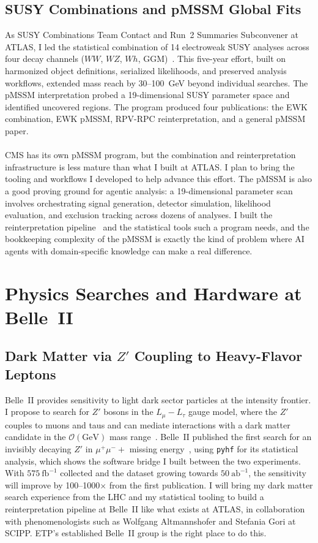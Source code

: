 \documentclass[10pt,a4paper,sans]{moderncv} %
\begin{document}
\subsection{SUSY Combinations and pMSSM Global Fits}
As SUSY Combinations Team Contact and Run~2 Summaries Subconvener at ATLAS, I led the statistical combination of 14 electroweak SUSY analyses across four decay channels ($WW$, $WZ$, $Wh$, GGM)~\cite{ATLAS:2024qxh}. This five-year effort, built on harmonized object definitions, serialized likelihoods, and preserved analysis workflows, extended mass reach by 30--100~GeV beyond individual searches. The pMSSM interpretation probed a 19-dimensional SUSY parameter space and identified uncovered regions. The program produced four publications: the EWK combination, EWK pMSSM, RPV-RPC reinterpretation, and a general pMSSM paper.
\\
\\
CMS has its own pMSSM program, but the combination and reinterpretation infrastructure is less mature than what I built at ATLAS. I plan to bring the tooling and workflows I developed to help advance this effort. The pMSSM is also a good proving ground for agentic analysis: a 19-dimensional parameter scan involves orchestrating signal generation, detector simulation, likelihood evaluation, and exclusion tracking across dozens of analyses. I built the reinterpretation pipeline~\cite{10.21468/SciPostPhysCodeb.27} and the statistical tools such a program needs, and the bookkeeping complexity of the pMSSM is exactly the kind of problem where AI agents with domain-specific knowledge can make a real difference.

\section{Physics Searches and Hardware at Belle~II}

\subsection{Dark Matter via $Z'$ Coupling to Heavy-Flavor Leptons}
Belle~II provides sensitivity to light dark sector particles at the intensity frontier. I propose to search for $Z'$ bosons in the $L_\mu - L_\tau$ gauge model, where the $Z'$ couples to muons and taus and can mediate interactions with a dark matter candidate in the $\mathcal{O}(\mathrm{GeV})$ mass range~\cite{Altmannshofer:2016jzy}. Belle~II published the first search for an invisibly decaying $Z'$ in $\mu^+\mu^- +$ missing energy~\cite{Belle-II:2019qfb}, using \texttt{pyhf} for its statistical analysis, which shows the software bridge I built between the two experiments. With $575\ \mathrm{fb}^{-1}$ collected and the dataset growing towards $50\ \mathrm{ab}^{-1}$, the sensitivity will improve by 100--1000$\times$ from the first publication. I will bring my dark matter search experience from the LHC and my statistical tooling to build a reinterpretation pipeline at Belle~II like what exists at ATLAS, in collaboration with phenomenologists such as Wolfgang Altmannshofer and Stefania Gori at SCIPP. ETP's established Belle~II group is the right place to do this.
\end{document}
